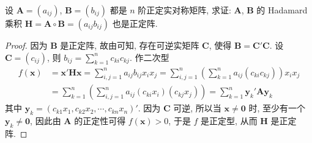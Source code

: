 \documentclass[../../main.tex]{subfiles}
\begin{document}
\begin{proposition}\label{proposition:正定实对称阵的Hadamard积也正定}
设 \(\boldsymbol{A}=(a_{ij})\), \(\boldsymbol{B}=(b_{ij})\) 都是 \(n\) 阶正定实对称矩阵, 求证: \(\boldsymbol{A}\), \(\boldsymbol{B}\) 的 Hadamard 乘积 \(\boldsymbol{H}=\boldsymbol{A}\circ\boldsymbol{B}=(a_{ij}b_{ij})\) 也是正定阵.
\end{proposition}
\begin{proof}
因为 \(\boldsymbol{B}\) 是正定阵, 故由可知, 存在可逆实矩阵 \(\boldsymbol{C}\), 使得 \(\boldsymbol{B}=\boldsymbol{C}'\boldsymbol{C}\). 设 \(\boldsymbol{C}=(c_{ij})\), 则 \(b_{ij}=\sum_{k = 1}^{n}c_{ki}c_{kj}\). 作二次型
\begin{align*}
f(\boldsymbol{x})&=\boldsymbol{x}'\boldsymbol{H}\boldsymbol{x}=\sum_{i,j = 1}^{n}a_{ij}b_{ij}x_ix_j=\sum_{i,j = 1}^{n}\left(\sum_{k = 1}^{n}a_{ij}(c_{ki}c_{kj})\right)x_ix_j\\
&=\sum_{k = 1}^{n}\left(\sum_{i,j = 1}^{n}a_{ij}(c_{ki}x_i)(c_{kj}x_j)\right)=\sum_{k = 1}^{n}\boldsymbol{y}_k'\boldsymbol{A}\boldsymbol{y}_k
\end{align*}
其中 \(\boldsymbol{y}_k=(c_{k1}x_1,c_{k2}x_2,\cdots,c_{kn}x_n)'\). 因为 \(\boldsymbol{C}\) 可逆, 所以当 \(\boldsymbol{x}\neq\boldsymbol{0}\) 时, 至少有一个 \(\boldsymbol{y}_k\neq\boldsymbol{0}\), 因此由 \(\boldsymbol{A}\) 的正定性可得 \(f(\boldsymbol{x})>0\), 于是 \(f\) 是正定型, 从而 \(\boldsymbol{H}\) 是正定阵.

\end{proof}
\end{document}
